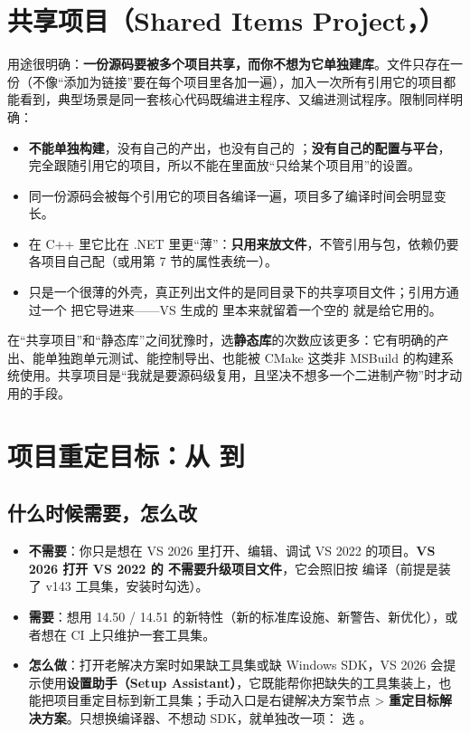 {{\section{共享项目（Shared Items Project，）}

用途很明确：\textbf{一份源码要被多个项目共享，而你不想为它单独建库}。文件只存在一份（不像“添加为链接”要在每个项目里各加一遍），加入一次所有引用它的项目都能看到，典型场景是同一套核心代码既编进主程序、又编进测试程序。限制同样明确：

\begin{itemize}
  \item \textbf{不能单独构建}，没有自己的产出，也没有自己的 ；\textbf{没有自己的配置与平台}，完全跟随引用它的项目，所以不能在里面放“只给某个项目用”的设置。
  \item 同一份源码会被每个引用它的项目各编译一遍，项目多了编译时间会明显变长。
  \item 在 C++ 里它比在 .NET 里更“薄”：\textbf{只用来放文件}，不管引用与包，依赖仍要各项目自己配（或用第 7 节的属性表统一）。
  \item {} 只是一个很薄的外壳，真正列出文件的是同目录下的共享项目文件；引用方通过一个  把它导进来——VS 生成的  里本来就留着一个空的  就是给它用的。
\end{itemize}

\begin{tipbox}[提示]
在“共享项目”和“静态库”之间犹豫时，选\textbf{静态库}的次数应该更多：它有明确的产出、能单独跑单元测试、能控制导出、也能被 CMake 这类非 MSBuild 的构建系统使用。共享项目是“我就是要源码级复用，且坚决不想多一个二进制产物”时才动用的手段。
\end{tipbox}

\section{项目重定目标：从  到 }

\subsection{什么时候需要，怎么改}

\begin{itemize}
  \item \textbf{不需要}：你只是想在 VS 2026 里打开、编辑、调试 VS 2022 的项目。\textbf{VS 2026 打开 VS 2022 的  不需要升级项目文件}，它会照旧按  编译（前提是装了 v143 工具集，安装时勾选）。
  \item \textbf{需要}：想用 14.50 / 14.51 的新特性（新的标准库设施、新警告、新优化），或者想在 CI 上只维护一套工具集。
  \item \textbf{怎么做}：打开老解决方案时如果缺工具集或缺 Windows SDK，VS 2026 会提示使用\textbf{设置助手（Setup Assistant）}，它既能帮你把缺失的工具集装上，也能把项目重定目标到新工具集；手动入口是右键解决方案节点 > \textbf{重定目标解决方案}。只想换编译器、不想动 SDK，就单独改一项： 选 。
\end{itemize}

}}
